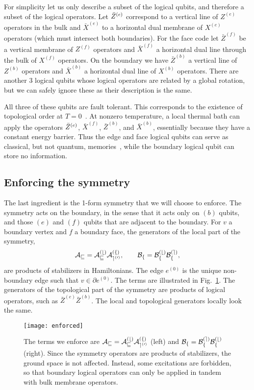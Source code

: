 For simplicity let us only describe a subset of the logical qubits, and therefore a subset of the logical operators. Let $\Bar{Z}^{(e)}$ correspond to a vertical line of $Z^{(e)}$ operators in the bulk and $\bar{X}^{(e)}$ to a horizontal dual membrane of $X^{(e)}$ operators (which must intersect both boundaries). For the face code let $\bar{Z}^{(f)}$ be a vertical membrane of $Z^{(f)}$ operators and $\bar{X}^{(f)}$ a horizontal dual line through the bulk of $X^{(f)}$ operators. On the boundary we have $\bar{Z}^{(b)}$ a vertical line of $Z^{(b)}$ operators and $\bar{X}^{(b)}$ a horizontal dual line of $X^{(b)}$ operators.  There are another 3 logical qubits whose logical operators are related by a global rotation, but we can safely ignore these as their description is the same. 

All three of these qubits are fault tolerant. This corresponds to the existence of topological order at $T=0$~\cite{Kitaev2003Fault}. At nonzero temperature, a local thermal bath can apply the operators $\Bar{Z}^{(e)}$, $\bar{X}^{(f)}$, $\bar{Z}^{(b)}$, and $\bar{X}^{(b)}$, essentially because they have a constant energy barrier. Thus the edge and face logical qubits can serve as classical, but not quantum, memories~\cite{CastelnovoChamon2008}, while the boundary logical qubit can store no information.

\subsection{Enforcing the symmetry} \label{sub:symm}

The last ingredient is the 1-form symmetry that we will choose to enforce. The symmetry acts on the boundary, in the sense that it acts only on $(b)$ qubits, and those $(e)$ and $(f)$ qubits that are adjacent to the boundary. For $v$ a boundary vertex and $f$ a boundary face, the generators of the local part of the symmetry,
\begin{align}
\cal{A}_v = A_v^{(b)} A_{e^{(0)}}^{(f)}, \qquad \cal{B}_f = B_f^{(b)}B_f^{(e)}, \label{eqn:sym}
\end{align}
are products of stabilizers in Hamiltonians. The edge $e^{(0)}$ is the unique non-boundary edge such that $v\in\partial e^{(0)}$.  The terms are illustrated in Fig.~\ref{fig:enforced}. The generators of the topological part of the symmetry are products of logical operators, such as $\bar{Z}^{(e)}\bar{Z}^{(b)}$. The local and topological generators locally look the same.

\begin{figure}
\centering
\texttt{[image: enforced]}
\caption[The terms we enforce]{The terms we enforce are $\cal{A}_v = A_v^{(b)} A_{e^{(0)}}^{(f)}$ (left) and $\cal{B}_f = B_f^{(e)} B_f^{(b)}$ (right). Since the symmetry operators are products of stabilizers, the ground space is not affected. Instead, some excitations are forbidden, so that boundary logical operators can only be applied in tandem with bulk membrane operators.}
\label{fig:enforced}
\end{figure}

